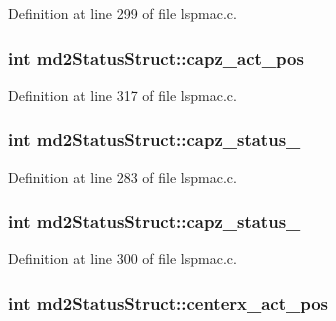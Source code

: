 Definition at line 299 of file lspmac.\-c.

\hypertarget{structmd2StatusStruct_a257c04efac3a33d5d34b21d64c6f1266}{
\subsubsection[{capz\-\_\-act\-\_\-pos}]{\setlength{\rightskip}{0pt plus 5cm}int md2\-Status\-Struct\-::capz\-\_\-act\-\_\-pos}}\label{structmd2StatusStruct_a257c04efac3a33d5d34b21d64c6f1266}


Definition at line 317 of file lspmac.\-c.

\hypertarget{structmd2StatusStruct_a719db4477f35331eaa8b7b44150e88a2}{
\subsubsection[{capz\-\_\-status\-\_\-1}]{\setlength{\rightskip}{0pt plus 5cm}int md2\-Status\-Struct\-::capz\-\_\-status\-\_}}\label{structmd2StatusStruct_a719db4477f35331eaa8b7b44150e88a2}


Definition at line 283 of file lspmac.\-c.

\hypertarget{structmd2StatusStruct_a3abb998bb89433aed16121d0dae6275a}{
\subsubsection[{capz\-\_\-status\-\_\-2}]{\setlength{\rightskip}{0pt plus 5cm}int md2\-Status\-Struct\-::capz\-\_\-status\-\_}}\label{structmd2StatusStruct_a3abb998bb89433aed16121d0dae6275a}


Definition at line 300 of file lspmac.\-c.

\hypertarget{structmd2StatusStruct_ae7924b6e91e1de82f6f7910cb3a9c9bd}{
\subsubsection[{centerx\-\_\-act\-\_\-pos}]{\setlength{\rightskip}{0pt plus 5cm}int md2\-Status\-Struct\-::centerx\-\_\-act\-\_\-pos}}\label{structmd2StatusStruct_ae7924b6e91e1de82f6f7910cb3a9c9bd}


